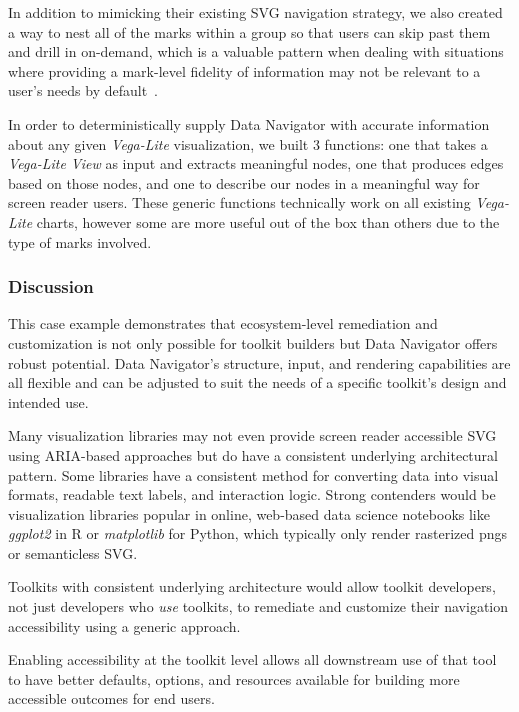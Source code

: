 \documentclass[12pt]{cmuthesis}
\begin{document}
In addition to mimicking their existing SVG navigation strategy, we also created a way to nest all of the marks within a group so that users can skip past them and drill in on-demand, which is a valuable pattern when dealing with situations where providing a mark-level fidelity of information may not be relevant to a user's needs by default~\cite{Shneiderman2003Eyes,Zong2022Rich}.

In order to deterministically supply Data Navigator with accurate information about any given \textit{Vega-Lite} visualization, we built 3 functions: one that takes a \textit{Vega-Lite View} as input and extracts meaningful nodes, one that produces edges based on those nodes, and one to describe our nodes in a meaningful way for screen reader users. These generic functions technically work on all existing \textit{Vega-Lite} charts, however some are more useful out of the box than others due to the type of marks involved.

\subsubsection{Discussion}
This case example demonstrates that ecosystem-level remediation and customization is not only possible for toolkit builders but Data Navigator offers robust potential. Data Navigator's structure, input, and rendering capabilities are all flexible and can be adjusted to suit the needs of a specific toolkit's design  and intended use.

Many visualization libraries may not even provide screen reader accessible SVG using ARIA-based approaches but do have a consistent underlying architectural pattern. Some libraries have a consistent method for converting data into visual formats, readable text labels, and interaction logic. Strong contenders would be visualization libraries popular in online, web-based data science notebooks like \textit{ggplot2} in R or \textit{matplotlib} for Python, which typically only render rasterized pngs or semanticless SVG.

Toolkits with consistent underlying architecture would allow toolkit developers, not just developers who \textit{use} toolkits, to remediate and customize their navigation accessibility using a generic approach.

Enabling accessibility at the toolkit level allows all downstream use of that tool to have better defaults, options, and resources available for building more accessible outcomes for end users.
\end{document}
